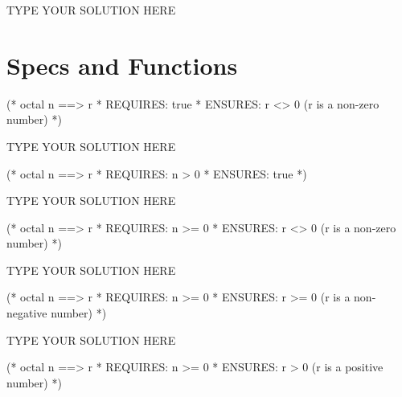 \documentclass[11pt]{article}
\begin{document}
\begin{solution}
TYPE YOUR SOLUTION HERE
\end{solution}


\section{Specs and Functions}

\begin{task}{2}
\begin{sml}
(* octal n ==> r
 * REQUIRES: true
 * ENSURES:  r <> 0 (r is a non-zero number)
 *)
\end{sml}
\end{task}

\begin{solution}
TYPE YOUR SOLUTION HERE
\end{solution}


\begin{task}{2}
\begin{sml}
(* octal n ==> r
 * REQUIRES: n > 0
 * ENSURES:  true
 *)
\end{sml}
\end{task}

\begin{solution}
TYPE YOUR SOLUTION HERE
\end{solution}


\begin{task}{2}
\begin{sml}
(* octal n ==> r
 * REQUIRES: n >= 0
 * ENSURES:  r <> 0 (r is a non-zero number)
 *)
\end{sml}
\end{task}

\begin{solution}
TYPE YOUR SOLUTION HERE
\end{solution}


\begin{task}{2}
\begin{sml}
(* octal n ==> r
 * REQUIRES: n >= 0
 * ENSURES:  r >= 0 (r is a non-negative number)
 *)
\end{sml}
\end{task}

\begin{solution}
TYPE YOUR SOLUTION HERE
\end{solution}


\begin{task}{2}
\begin{sml}
(* octal n ==> r
 * REQUIRES: n >= 0
 * ENSURES:  r > 0 (r is a positive number)
 *)
\end{sml}
\end{task}
\end{document}
